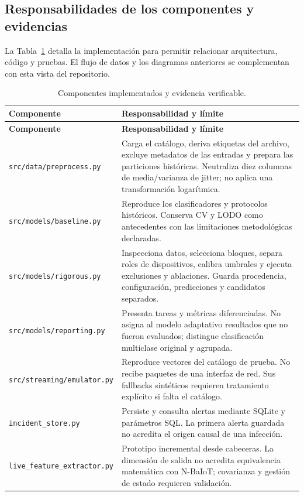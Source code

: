 \documentclass[11pt,a4paper]{article}
\begin{document}
\subsection{Responsabilidades de los componentes y evidencias}
La Tabla~\ref{tab:modulos} detalla la implementación para permitir relacionar arquitectura, código y pruebas. El flujo de datos y los diagramas anteriores se complementan con esta vista del repositorio.
\begin{longtable}{p{}p{}}
\caption{Componentes implementados y evidencia verificable.}\label{tab:modulos}\\
\toprule
\textbf{Componente} & \textbf{Responsabilidad y límite}\\
\midrule
\endfirsthead
\toprule
\textbf{Componente} & \textbf{Responsabilidad y límite}\\
\midrule
\endhead
\texttt{src/data/preprocess.py} & Carga el catálogo, deriva etiquetas del archivo, excluye metadatos de las entradas y prepara las particiones históricas. Neutraliza diez columnas de media/varianza de jitter; no aplica una transformación logarítmica.\\
\addlinespace
\texttt{src/models/baseline.py} & Reproduce los clasificadores y protocolos históricos. Conserva CV y LODO como antecedentes con las limitaciones metodológicas declaradas.\\
\addlinespace
\texttt{src/models/rigorous.py} & Inspecciona datos, selecciona bloques, separa roles de dispositivos, calibra umbrales y ejecuta exclusiones y ablaciones. Guarda procedencia, configuración, predicciones y candidatos separados.\\
\addlinespace
\texttt{src/models/reporting.py} & Presenta tareas y métricas diferenciadas. No asigna al modelo adaptativo resultados que no fueron evaluados; distingue clasificación multiclase original y agrupada.\\
\addlinespace
\texttt{src/streaming/emulator.py} & Reproduce vectores del catálogo de prueba. No recibe paquetes de una interfaz de red. Sus fallbacks sintéticos requieren tratamiento explícito si falta el catálogo.\\
\addlinespace
\texttt{incident\_store.py} & Persiste y consulta alertas mediante SQLite y parámetros SQL. La primera alerta guardada no acredita el origen causal de una infección.\\
\addlinespace
\texttt{live\_feature\_extractor.py} & Prototipo incremental desde cabeceras. La dimensión de salida no acredita equivalencia matemática con N-BaIoT; covarianza y gestión de estado requieren validación.\\

\end{longtable}
\end{document}
